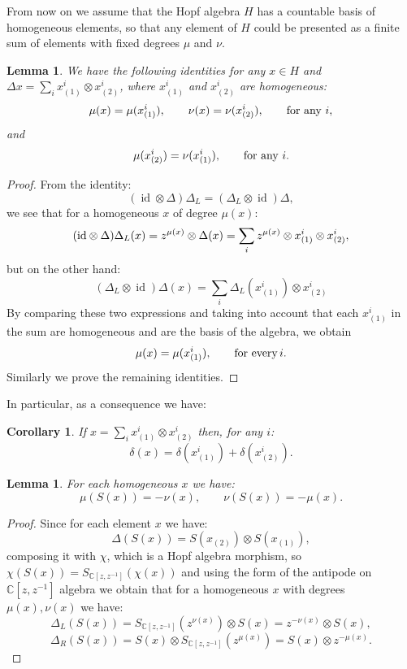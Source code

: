 \documentclass[12pt]{amsart}
\newtheorem{lem}[thm]{Lemma}
\newtheorem{cor}[thm]{Corollary}
\theoremstyle{definition}
\numberwithin{equation}{section}
\renewcommand{\a}{\chi}             %
\newcommand{\C}{\mathbb{C}}         %
\newcommand{\ox}{\otimes}           %
\DeclareMathOperator{\id}{id}       %
\begin{document}
{}From now on we assume that the Hopf algebra $H$ has a countable basis of 
homogeneous elements, so that any element of $H$ could be presented as a finite
sum of elements with fixed degrees $\mu$ and $\nu$.
\begin{lem}
\label{degprop}
We have the following identities for any $x \in H$ and  
$\Delta x = \sum_i x_{(1)}^i \otimes  x_{(2)}^i$, where $x_{(1)}^i$
and $x_{(2)}^i$ are homogeneous:
$$ \mu(x) = \mu(x_{(1)}^i), \qquad \nu(x) =  \nu(x_{(2)}^i), 
\qquad \hbox{for any $i$}, $$
and
$$ \mu(x_{(2)}^i) = \nu(x_{(1)}^i), \qquad \hbox{for any $i$}.$$
\end{lem}
\begin{proof}
From the identity:
$$  (\id \ox \Delta) \Delta_L = ( \Delta_L \ox \id) \Delta, $$ 
we see that for a homogeneous $x$ of degree $\mu(x)$:
$$ (\hbox{id} \otimes \Delta) \Delta_L(x) =  z^{\mu(x)} \otimes \Delta(x) = 
\sum_i z^{\mu(x)} \otimes x_{(1)}^i \otimes  x_{(2)}^i, $$
but on the other hand:
$$  ( \Delta_L \ox \id) \Delta (x) = \sum_i \Delta_L(x_{(1)}^i) \otimes x_{(2)}^i $$
By comparing these two expressions and taking into account that each $x_{(1)}^i$ in the sum 
are homogeneous and are the basis of the algebra, we obtain 
$$ \mu(x) = \mu(x_{(1)}^i), \qquad \hbox{for every} \, i. $$
Similarly we prove the remaining identities.
\end{proof}
In particular, as a consequence we have:
\begin{cor}
If $x = \sum_i x_{(1)}^i \otimes x_{(2)}^i$ then, for any $i$: 
\begin{equation}
\delta(x) = \delta(x_{(1)}^i) +  \delta(x_{(2)}^i). 
\label{degad}
\end{equation} 
\end{cor}
\begin{lem}
\label{antipode}
For each homogeneous $x$ we have:
\begin{equation}
\mu(S(x))=-\nu(x), \qquad \nu(S(x))=-\mu(x).
\end{equation} 
\end{lem}
\begin{proof}
Since for each element $x$ we have:
$$ \Delta (S(x)) = S(x_{(2)}) \ox S(x_{(1)}), $$
composing it with $\a$, which is a Hopf algebra morphism, so
$\a(S(x)) =S_{\C[z,z^{-1}]} (\a(x))$ and using the form of the antipode 
on ${\C[z,z^{-1}]}$ algebra we obtain that for a homogeneous $x$
with degrees $\mu(x),\nu(x)$ we have:
$$\Delta_L(S(x)) = S_{\C[z,z^{-1}]}(z^{\nu(x)})  \ox S(x) = z^{-\nu(x)} \ox S(x),$$
$$\Delta_R(S(x)) = S(x) \ox S_{\C[z,z^{-1}]}(z^{\mu(x)}) = S(x) \ox z^{-\mu(x)}.$$
\end{proof}
\end{document}

